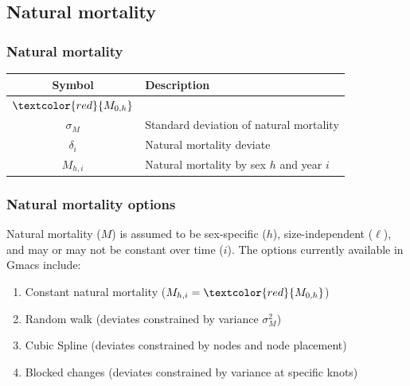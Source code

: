 \documentclass{beamer}
\begin{document}

\subsection{Natural mortality}
\begin{frame}
\frametitle{Natural mortality}
\begin{table}
  \centering
  \begin{tabular}{cl}
  \hline
  Symbol  & Description \\
  \hline
      $\textcolor{red}{M_{0,h}}$ &  \\
      $\sigma_M$ & Standard deviation of natural mortality \\
      $\delta_i$ & Natural mortality deviate \\
      $M_{h,i}$ & Natural mortality by sex $h$ and year $i$ \\
  \hline
  \end{tabular}
\end{table}
\end{frame}


\begin{frame}
\frametitle{Natural mortality options}
Natural mortality ($M$) is assumed to be sex-specific ($h$), size-independent
($\ell$), and may or may not be constant over time ($i$). The options currently
available in Gmacs include:
\begin{enumerate}
\item Constant natural mortality ($M_{h,i} = \textcolor{red}{M_{0,h}}$)
\item Random walk (deviates constrained by variance $\sigma^2_M$)
\item Cubic Spline (deviates constrained by nodes and node placement)
\item Blocked changes (deviates constrained by variance at specific knots)
\end{enumerate}
\end{frame}

\end{document}
